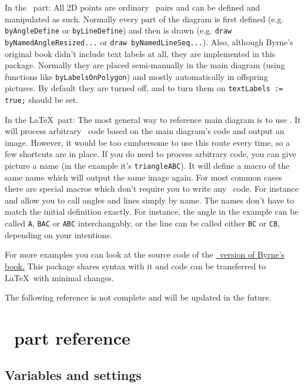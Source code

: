 In the \METAPOST\ part: 
All 2D points are ordinary \METAPOST\ pairs and can be defined and manipulated as such. Normally every part of the diagram is first defined (e.g. \texttt{byAngleDefine} or \texttt{byLineDefine}) and then is drawn (e.g. \texttt{draw byNamedAngleResized...} or \texttt{draw byNamedLineSeq...}). Also, although Byrne's original book didn't include text labels at all, they are implemented in this package. Normally they are placed semi-manually in the main diagram (using functions like \texttt{byLabelsOnPolygon}) and mostly automatically in offspring pictures. By default they are turned off, and to turn them on \texttt{textLabels := true;} should be set.

In the \LaTeX\ part: 
The most general way to reference main diagram is to use . It will process arbitrary \METAPOST\ code based on the main diagram's code and output an image. However, it would be too cumbersome to use this route every time, so a few shortcuts are in place. If you do need to process arbitrary code, you can give picture a name (in the example it's \texttt{triangleABC}). It will define a macro of the same name  which will output the same image again. For most common cases there are special macros which don't require you to write any \METAPOST\ code. For instance  and  allow you to call angles and lines simply by name. The names don't have to match the initial definition exactly. For instance, the angle in the example can be called \texttt{A}, \texttt{BAC} or \texttt{ABC} interchangably, or the line can be called either \texttt{BC} or \texttt{CB}, depending on your intentions.

For more examples you can look at the source code of the \href{https://github.com/jemmybutton/byrne-euclid/}{\ConTeXt\ version of Byrne's book.} This package shares syntax with it and code can be transferred to \LaTeX\ with minimal changes.

The following reference is not complete and will be updated in the future.

\section{\METAPOST\ part reference}

\subsection{Variables and settings}

